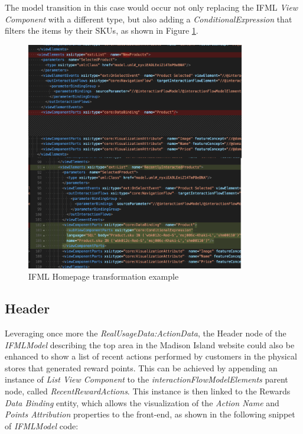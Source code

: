 The model transition in this case would occur not only replacing the IFML \textit{View Component} with a different type, but also adding a \textit{ConditionalExpression} that filters the items by their SKUs, as shown in Figure \ref{fig:ifml-transformation-example}.

\vspace{0.5cm}
\begin{figure}[H]
  \centering
    \includegraphics[height=10cm]{images/madison/ifm-homepage-transformation.png}
  \caption{IFML Homepage transformation example}
  \label{fig:ifml-transformation-example}
\end{figure}
\vspace{0.5cm}

\subsection{Header}
\label{header-updates}

Leveraging once more the \textit{RealUsageData:ActionData}, the Header node of the \textit{IFMLModel} describing the top area in the Madison Island website could also be enhanced to show a list of recent actions performed by customers in the physical stores that generated reward points. This can be achieved by appending an instance of \textit{List View Component} to the \textit{interactionFlowModelElements} parent node, called \textit{RecentRewardActions}. This instance is then linked to the Rewards \textit{Data Binding} entity, which allows the visualization of the \textit{Action Name} and \textit{Points Attribution} properties to the front-end, as shown in the following snippet of \textit{IFMLModel} code:

